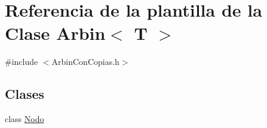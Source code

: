 \hypertarget{class_arbin}{
\section{\-Referencia de la plantilla de la \-Clase \-Arbin$<$ \-T $>$}
\label{class_arbin}
}


{\ttfamily \#include $<$\-Arbin\-Con\-Copias.\-h$>$}

\subsection*{\-Clases}
\begin{DoxyCompactItemize}
\item 
class \hyperlink{class_arbin_1_1_nodo}{\-Nodo}
\end{DoxyCompactItemize}
